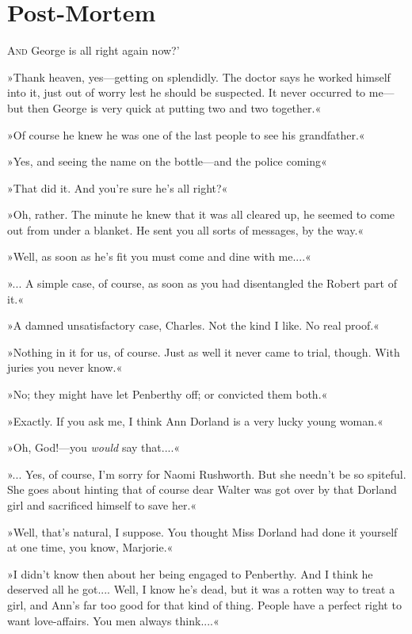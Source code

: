 \chapter{Post-Mortem}

\lettrine[lines=4,ante=‘]{A}{nd} George is all right again now?'

\zz
»Thank heaven, yes\allowbreak---\allowbreak getting on splendidly. The doctor says he worked himself into it, just out of worry lest he should be suspected. It never occurred to me\allowbreak---\allowbreak but then George is very quick at putting two and two together.«

»Of course he knew he was one of the last people to see his grandfather.«

»Yes, and seeing the name on the bottle\allowbreak---\allowbreak and the police coming\longdash«

»That did it. And you're sure he's all right?«

»Oh, rather. The minute he knew that it was all cleared up, he seemed to come out from under a blanket. He sent you all sorts of messages, by the way.«

»Well, as soon as he's fit you must come and dine with me....«

»... A simple case, of course, as soon as you had disentangled the Robert part of it.«

»A damned unsatisfactory case, Charles. Not the kind I like. No real proof.«

»Nothing in it for us, of course. Just as well it never came to trial, though. With juries you never know.«

»No; they might have let Penberthy off; or convicted them both.«

»Exactly. If you ask me, I think Ann Dorland is a very lucky young woman.«

»Oh, God!---you \textit{would} say that....«

»... Yes, of course, I'm sorry for Naomi Rushworth. But she needn't be so spiteful. She goes about hinting that of course dear Walter was got over by that Dorland girl and sacrificed himself to save her.«

»Well, that's natural, I suppose. You thought Miss Dorland had done it yourself at one time, you know, Marjorie.«

»I didn't know then about her being engaged to Penberthy. And I think he deserved all he got.... Well, I know he's dead, but it was a rotten way to treat a girl, and Ann's far too good for that kind of thing. People have a perfect right to want love-affairs. You men always think....«

